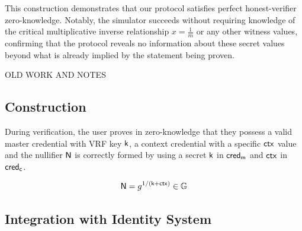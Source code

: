 This construction demonstrates that our protocol satisfies perfect honest-verifier zero-knowledge. Notably, the simulator succeeds without requiring knowledge of the critical multiplicative inverse relationship $x = \frac{1}{m}$ or any other witness values, confirming that the protocol reveals no information about these secret values beyond what is already implied by the statement being proven.









































OLD WORK AND NOTES







\subsection{Construction}
During verification, the user proves in zero-knowledge that they possess a valid master credential with VRF key $\mathsf{k}$, a context credential with a specific $\mathsf{ctx}$ value and the nullifier $\mathsf{N}$ is correctly formed by using a secret $\mathsf{k}$ in $\mathsf{cred_m}$ and $\mathsf{ctx}$ in $\mathsf{cred_c}$. 

\begin{equation}
\mathsf{N} = g^{1/(\mathsf{k} + \mathsf{ctx})} \in \mathbb{G}
\end{equation}

\subsection{Integration with Identity System}


